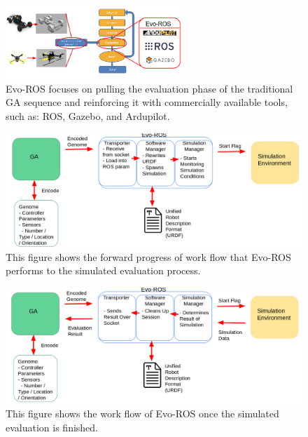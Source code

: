 \documentclass{report}
\begin{document}
\begin{figure}
	\centering \includegraphics[width=0.6\textwidth]{Images/Evo-ROS_GA_Overview.png}
	\caption{Evo-ROS focuses on pulling the evaluation phase of the traditional GA sequence and reinforcing it with commercially available tools, such as: ROS, Gazebo, and Ardupilot.}
	\label{Evo-ROS_GA_Overview}	
\end{figure}

\begin{figure}[h]
	\centering
	\includegraphics[scale=0.33]{Images/Evo-ROS_Forward_Workflow.png}
	\caption{This figure shows the forward progress of work flow that Evo-ROS performs to the simulated evaluation process.}
	\label{Evo-ROS_Forward_Workflow}
\end{figure}

\begin{figure}[h]
	\centering
	\includegraphics[scale=0.33]{Images/Evo-ROS_Backward_Workflow.png}
	\caption{This figure shows the work flow of Evo-ROS once the simulated evaluation is finished.}
	\label{Evo-ROS_Backward_Workflow}
\end{figure}
\fi 
\end{document}
